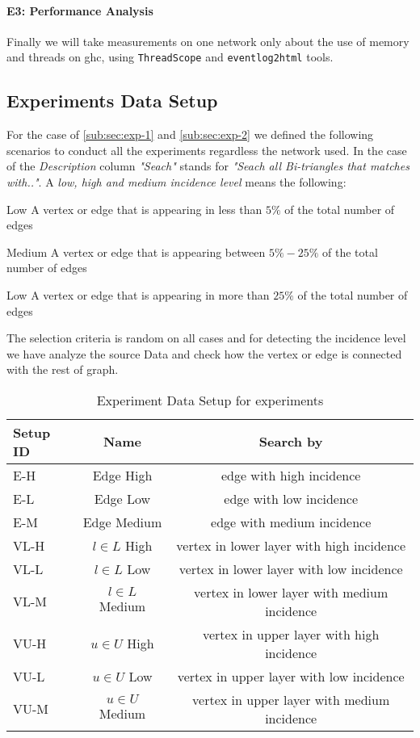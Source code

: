 \paragraph{E3: Performance Analysis}\label{sub:sec:exp-3} Finally we will take measurements on one network only about the use of memory and threads on \acrshort{ghc}, using
\texttt{ThreadScope} \cite{threadscope} and \texttt{eventlog2html} \cite{eventlog2html} tools. 

\subsection{Experiments Data Setup}\label{sub:exp:exp-data-setup}
For the case of \autoref{sub:sec:exp-1} and \autoref{sub:sec:exp-2} we defined the following scenarios to conduct all the experiments regardless the network used.
In the case of the \emph{Description} column \emph{"Seach"} stands for \emph{"Seach all Bi-triangles that matches with.."}.
A \emph{low, high and medium incidence level} means the following:
\begin{inparaenum}
  \item[Low] A vertex or edge that is appearing in less than $5\%$ of the total number of edges
  \item[Medium] A vertex or edge that is appearing between $5\%-25\%$ of the total number of edges
  \item[Low] A vertex or edge that is appearing in more than $25\%$ of the total number of edges
\end{inparaenum}
The selection criteria is random on all cases and for detecting the incidence level we have analyze the source Data
and check how the vertex or edge is connected with the rest of graph.

\begin{table}[H]
  \centering
  \begin{tabular}{|l|c|c|}
    \hline
   \textbf{Setup ID} & \textbf{Name} & \textbf{Search by}\\
   \hline
   E-H & Edge High & edge with high incidence \\
   \hline
   E-L & Edge Low & edge with low incidence \\
   \hline
   E-M & Edge Medium & edge with medium incidence \\
   \hline
   VL-H & $l \in L$ High & vertex in lower layer with high incidence \\
   \hline
   VL-L & $l \in L$ Low & vertex in lower layer with low incidence \\
   \hline
   VL-M & $l \in L$ Medium & vertex in lower layer with medium incidence \\
   \hline
   VU-H & $u \in U$ High & vertex in upper layer with high incidence \\
   \hline
   VU-L & $u \in U$ Low & vertex in upper layer with low incidence \\
   \hline
   VU-M & $u \in U$ Medium & vertex in upper layer with medium incidence \\
   \hline
  \end{tabular}
 \caption{Experiment Data Setup for experiments}
 \label{table:exp:data-setup}
 \end{table}

